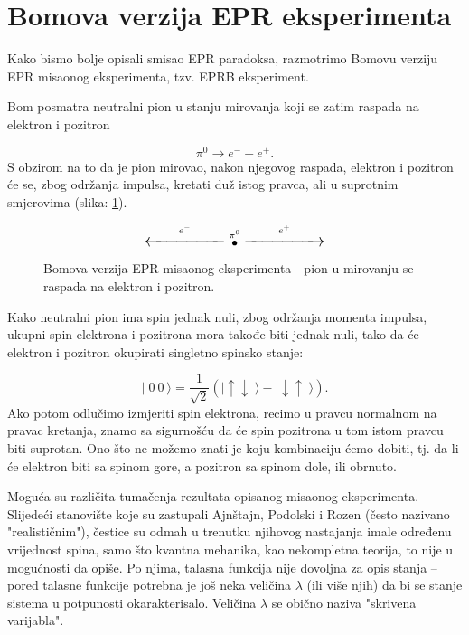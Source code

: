 \section{Bomova verzija EPR eksperimenta}

Kako bismo bolje opisali smisao EPR paradoksa, razmotrimo Bomovu verziju EPR misaonog eksperimenta, tzv. EPRB eksperiment.

Bom posmatra neutralni pion u stanju mirovanja koji se zatim raspada na elektron i pozitron

\begin{equation}
  \pi^0 \rightarrow e^- + e^+.
\end{equation}
S obzirom na to da je pion mirovao, nakon njegovog raspada, elektron i pozitron će se, zbog odr\v zanja impulsa, kretati du\v z istog pravca, ali u suprotnim smjerovima (slika: \ref{fig:pion_decay}).

\begin{figure}[H]
  \[
    \Large{
      \overset{e^-}{\xleftarrow{\hspace{2cm}}}
      \overset{\pi^0}{\bullet}
      \overset{e^+}{\xrightarrow{\hspace{2cm}}}
    }
  \]
  \caption{Bomova verzija EPR misaonog eksperimenta - pion u mirovanju se raspada na elektron i pozitron.}
  \label{fig:pion_decay}
\end{figure}


Kako neutralni pion ima spin jednak nuli, zbog održanja momenta impulsa, ukupni spin elektrona i pozitrona mora takođe biti jednak nuli,
tako da će elektron i pozitron okupirati singletno spinsko stanje:

\begin{equation}
  | \;\! 0 \:\! 0 \:\! \rangle = \frac{1}{\sqrt2}(| \! \uparrow\downarrow \;\! \rangle - | \! \downarrow\uparrow \;\! \rangle). \label{eq:singlet_state}
\end{equation}
Ako potom odlučimo izmjeriti spin elektrona, recimo u pravcu normalnom na pravac kretanja, znamo sa sigurnošću da će spin pozitrona u tom istom pravcu biti suprotan.
Ono što ne možemo znati je koju kombinaciju ćemo dobiti, tj. da li će elektron biti sa spinom gore, a pozitron sa spinom dole, ili obrnuto.

Moguća su različita tumačenja rezultata opisanog misaonog eksperimenta.
Slijedeći stanovište koje su zastupali Ajnštajn, Podolski i Rozen (često nazivano "realističnim"), čestice su odmah u trenutku njihovog nastajanja imale određenu vrijednost spina, samo što kvantna mehanika, kao nekompletna teorija, to nije u mogućnosti da opiše.
Po njima, talasna funkcija nije dovoljna za opis stanja – pored talasne funkcije potrebna je još neka veličina $\lambda$ (ili više njih) da bi se stanje sistema u potpunosti okarakterisalo. Veličina $\lambda$ se obično naziva "skrivena varijabla".

